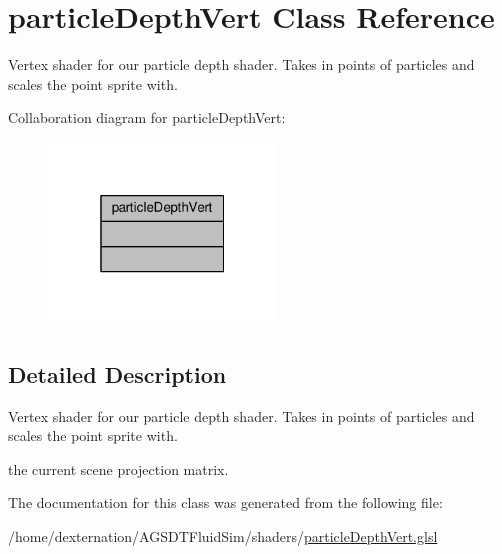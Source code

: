 \hypertarget{classparticle_depth_vert}{\section{particle\-Depth\-Vert Class Reference}
\label{classparticle_depth_vert}
}


Vertex shader for our particle depth shader. Takes in points of particles and scales the point sprite with.  




Collaboration diagram for particle\-Depth\-Vert\-:\nopagebreak
\begin{figure}[H]
\begin{center}
\leavevmode
\includegraphics[width=172pt]{classparticle_depth_vert__coll__graph}
\end{center}
\end{figure}


\subsection{Detailed Description}
Vertex shader for our particle depth shader. Takes in points of particles and scales the point sprite with. 

the current scene projection matrix. 

The documentation for this class was generated from the following file\-:\begin{DoxyCompactItemize}
\item 
/home/dexternation/\-A\-G\-S\-D\-T\-Fluid\-Sim/shaders/\hyperlink{particle_depth_vert_8glsl}{particle\-Depth\-Vert.\-glsl}\end{DoxyCompactItemize}
